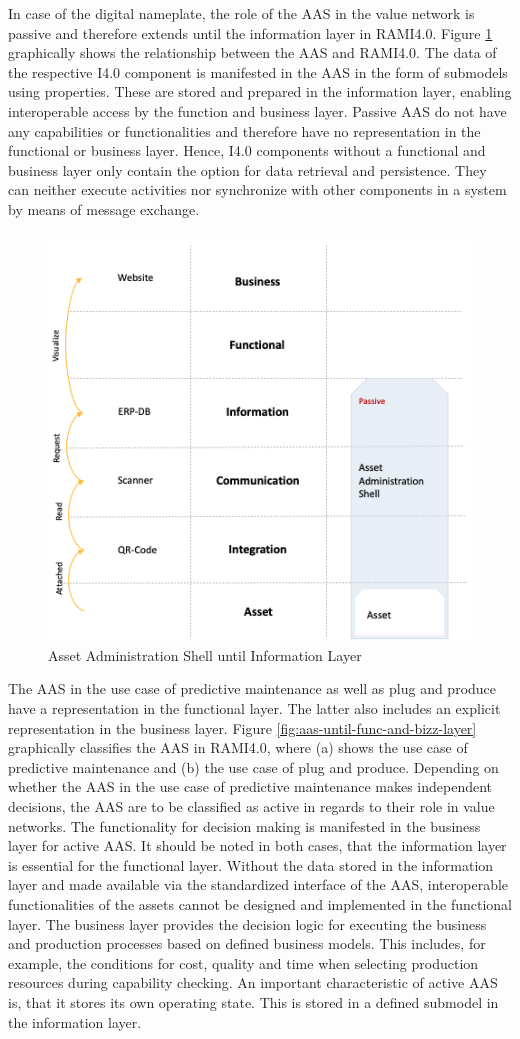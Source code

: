 In case of the digital nameplate, the role of the \ac{AAS} in the value network is passive and therefore extends until the information layer in \ac{RAMI4.0}. Figure \ref{fig:aas-until-info-layer} graphically shows the relationship between the \ac{AAS} and \ac{RAMI4.0}. The data of the respective \ac{I4.0} component is manifested in the \ac{AAS} in the form of submodels using properties. These are stored and prepared in the information layer, enabling interoperable access by the function and business layer. Passive \ac{AAS} do not have any capabilities or functionalities and therefore have no representation in the functional or business layer. Hence, \ac{I4.0} components without a functional and business layer only contain the option for data retrieval and persistence. They can neither execute activities nor synchronize with other components in a system by means of message exchange.
\begin{figure}[h]
\centering
\includegraphics[width=.45\textwidth]{content/pictures/aas_rami_v1.png}
\caption{Asset Administration Shell until Information Layer}
\label{fig:aas-until-info-layer}
\end{figure}

The \ac{AAS} in the use case of predictive maintenance as well as plug and produce have a representation in the functional layer. The latter also includes an explicit representation in the business layer. Figure \ref{fig:aas-until-func-and-bizz-layer} graphically classifies the \ac{AAS} in \ac{RAMI4.0}, where (a) shows the use case of predictive maintenance and (b) the use case of plug and produce. Depending on whether the \ac{AAS} in the use case of predictive maintenance makes independent decisions, the \ac{AAS} are to be classified as active in regards to their role in value networks. The functionality for decision making is manifested in the business layer for active \ac{AAS}. It should be noted in both cases, that the information layer is essential for the functional layer. Without the data stored in the information layer and made available via the standardized interface of the \ac{AAS}, interoperable functionalities of the assets cannot be designed and implemented in the functional layer. The business layer provides the decision logic for executing the business and production processes based on defined business models. This includes, for example, the conditions for cost, quality and time when selecting production resources during capability checking. An important characteristic of active \ac{AAS} is, that it stores its own operating state. This is stored in a defined submodel in the information layer.

